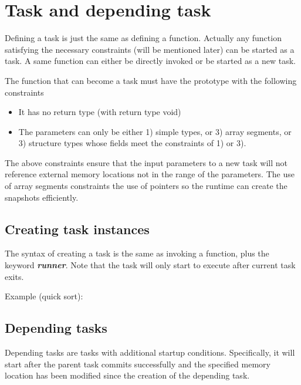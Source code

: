 \documentclass[a4paper]{article}
\begin{document}
{\section{Task and depending task}}


Defining a task is just the same as defining a function. Actually any function satisfying the necessary constraints (will be mentioned later) can be started as a task. A same function can either be directly invoked or be started as a new task.

The function that can become a task must have the prototype with the following constraints

\begin{itemize}
	\item It has no return type (with return type void)
	\item The parameters can only be either 1) simple types, or 3) array segments, or 3) structure types whose fields meet the constraints of 1) or 3).
\end{itemize}

The above constraints ensure that the input parameters to a new task will not reference external memory locations not in the range of the parameters. The use of array segments constraints the use of pointers so the runtime can create the snapshots efficiently.

{\subsection{Creating task instances}}

The syntax of creating a task is the same as invoking a function, plus the keyword \textbf{\textit{runner}}. Note that the task will only start to execute after current task exits.

Example (quick sort):

{\color{blue}{}}

{\subsection{Depending tasks}}

Depending tasks are tasks with additional startup conditions. Specifically, it will start after the parent task commits successfully and the specified memory location has been modified since the creation of the depending task.
\end{document}
